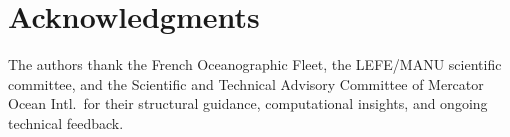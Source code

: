 \documentclass[10pt]{article}
\begin{document}
\section*{Acknowledgments}
The authors thank the French Oceanographic Fleet, the LEFE/MANU scientific committee, and the Scientific and Technical Advisory Committee of Mercator Ocean Intl.\ for their structural guidance, computational insights, and ongoing technical feedback.




\end{document}

